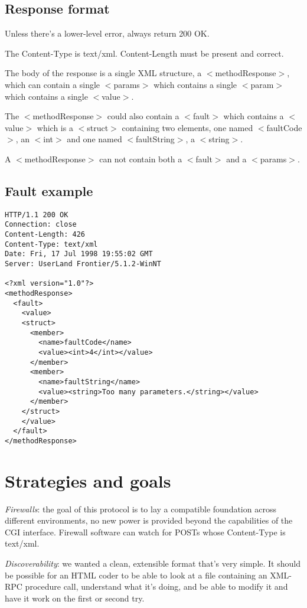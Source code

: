 \documentclass[10pt]{article}
\begin{document}
\subsection{Response format}

Unless there's a lower-level error, always return 200 OK.

The Content-Type is text/xml. Content-Length must be present and correct.

The body of the response is a single XML structure, a $<$methodResponse$>$, which can contain a single $<$params$>$ which contains a single $<$param$>$ which contains a single $<$value$>$.

The $<$methodResponse$>$ could also contain a $<$fault$>$ which contains a $<$value$>$ which is a $<$struct$>$ containing two elements, one named $<$faultCode$>$, an $<$int$>$ and one named $<$faultString$>$, a $<$string$>$.

A $<$methodResponse$>$ can not contain both a $<$fault$>$ and a $<$params$>$.
\subsection{Fault example}
\begin{verbatim}
HTTP/1.1 200 OK
Connection: close
Content-Length: 426
Content-Type: text/xml
Date: Fri, 17 Jul 1998 19:55:02 GMT
Server: UserLand Frontier/5.1.2-WinNT

<?xml version="1.0"?>
<methodResponse>
  <fault>
    <value>
    <struct>
      <member>
        <name>faultCode</name>
        <value><int>4</int></value>
      </member>
      <member>
        <name>faultString</name>
        <value><string>Too many parameters.</string></value>
      </member>
    </struct>
    </value>
  </fault>
</methodResponse>
\end{verbatim}


%
%

\section{Strategies and goals}

\emph{Firewalls}: the goal of this protocol is to lay a compatible foundation across different environments, no new power is provided beyond the capabilities of the CGI interface. Firewall software can watch for POSTs whose Content-Type is text/xml.

\emph{Discoverability}: we wanted a clean, extensible format that's very simple. It should be possible for an HTML coder to be able to look at a file containing an XML-RPC procedure call, understand what it's doing, and be able to modify it and have it work on the first or second try.
\end{document}
